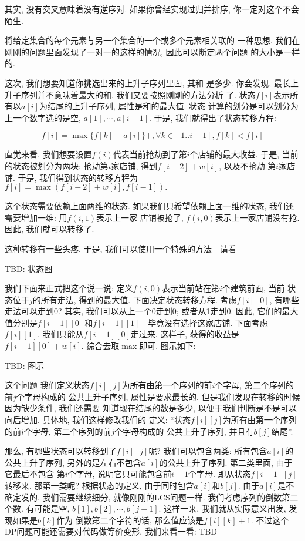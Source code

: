 其实, 没有交叉意味着没有逆序对. 如果你曾经实现过归并排序, 你一定对这个不会陌生. 

 将给定集合的每个元素与另一个集合的一个或多个元素相关联的
一种思想. 我们在刚刚的问题里面发现了一对一的这样的情况, 因此可以断定两个问题
的大小是一样的. 

 这次, 我们想要知道你挑选出来的上升子序列里面, 其和
是多少. 你会发现, 最长上升子序列并不意味着最大的和. 我们又要按照刚刚的方法分析
了.  状态$f[i]$表示所有以$a[i]$为结尾的上升子序列, 属性是和的最大值. 状态
计算的划分是可以划分为上一个数字选的是空, $a[1], \cdots, a[i-1]$. 于是, 
我们就得出了状态转移方程: 

$$f[i] = \max \{f[k]+a[i]\} +, \forall k\in [1..i-1], f[k]<f[i]$$ 

直觉来看, 我们想要设置$f(i)$代表当前抢劫到了第$i$个店铺的最大收益. 于是, 当前
的状态被划分为两块: 抢劫第$i$家店铺, 得到$f[i-2]+w[i]$, 以及不抢劫
第$i$家店铺. 于是, 我们得到状态的转移方程为$f[i]=\max(f[i-2]+w[i], f[i-1]).$

这个状态需要依赖上面两维的状态. 如果我们只希望依赖上面一维的状态, 
我们还需要增加一维: 用$f(i, 1)$表示上一家
店铺被抢了, $f(i, 0)$表示上一家店铺没有抢. 因此, 我们就可以转移了. 

这种转移有一些头疼. 于是, 我们可以使用一个特殊的方法 - 请看

TBD: 状态图 %

我们下面来正式把这个说一说: 定义$f(i,0)$表示当前站在第$i$个建筑前面, 当前
状态位于$j$的所有走法, 得到的最大值. 下面决定状态转移方程. 考虑$f[i][0]$, 
有哪些走法可以走到0? 其实, 我们可以从上一个0走到0; 或者从1走到0. 因此, 
它们的最大值分别是$f[i-1][0]$和$f[i-1][1]$ - 毕竟没有选择这家店铺. 
下面考虑$f[i][1]$. 我们只能从$f[i-1][0]$走过来. 这样子, 获得的收益是
$f[i-1][0] + w[i]$. 综合去取$\max$即可. 图示如下:

TBD: 图示

 这个问题
我们定义状态$f[i][j]$为所有由第一个序列的前$i$个字母, 第二个序列的前$j$个字母构成的
公共上升子序列, 属性是要求最长的. 但是我们发现在转移的时候因为缺少条件, 我们还需要
知道现在结尾的数是多少, 以便于我们判断是不是可以向后增加. 具体地, 我们这样修改我们的
定义: ``状态$f[i][j]$为所有由第一个序列的前$i$个字母, 第二个序列的前$j$个字母构成的
公共上升子序列, 并且有$b[j]$结尾''. 

那么, 有哪些状态可以转移到了$f[i][j]$呢? 我们可以包含两类: 所有包含$a[i]$的 
公共上升子序列, 另外的是左右不包含$a[i]$的公共上升子序列. 第二类里面, 由于它最后不包含
第$i$个字母, 说明它只可能包含前$i-1$个字母. 即从状态$f[i-1][j]$转移来. 那第一类呢? 
根据状态的定义, 由于同时包含$a[i]$和$b[j]$. 由于$a[i]$是不确定发的, 我们需要继续细分, 
就像刚刚的LCS问题一样. 我们考虑序列的倒数第二个数. 有可能是空, 
$b[1], b[2], \cdots, b[j-1]$. 这样一来, 我们就从实际意义出发, 发现如果是$b[k]$作为
倒数第二个字符的话, 那么值应该是$f[i][k]+1$. 不过这个DP问题可能还需要对代码做等价变形, 
我们来看一看: TBD

